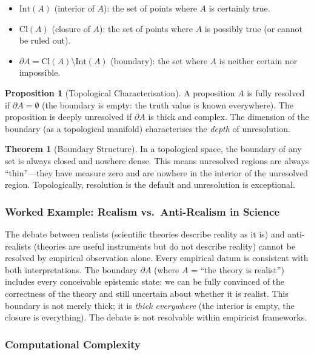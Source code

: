 \documentclass[11pt,letterpaper]{article}
\theoremstyle{definition}
\newtheorem{proposition}{Proposition}[section]
\newtheorem{theorem}{Theorem}[section]
\theoremstyle{remark}
\begin{document}
\begin{itemize}
\item $\mathrm{Int}(A)$ (interior of $A$): the set of points where $A$ is certainly true.
\item $\mathrm{Cl}(A)$ (closure of $A$): the set of points where $A$ is possibly true (or cannot be ruled out).
\item $\partial A = \mathrm{Cl}(A) \setminus \mathrm{Int}(A)$ (boundary): the set where $A$ is neither certain nor impossible.
\end{itemize}

\begin{proposition}[Topological Characterisation]
A proposition $A$ is fully resolved if $\partial A = \emptyset$ (the boundary is empty: the truth value is known everywhere). The proposition is deeply unresolved if $\partial A$ is thick and complex. The dimension of the boundary (as a topological manifold) characterises the \emph{depth} of unresolution.
\end{proposition}

\begin{theorem}[Boundary Structure]
In a topological space, the boundary of any set is always closed and nowhere dense. This means unresolved regions are always ``thin''---they have measure zero and are nowhere in the interior of the unresolved region. Topologically, resolution is the default and unresolution is exceptional.
\end{theorem}

\subsubsection*{Worked Example: Realism vs.\ Anti-Realism in Science}

The debate between realists (scientific theories describe reality as it is) and anti-realists (theories are useful instruments but do not describe reality) cannot be resolved by empirical observation alone. Every empirical datum is consistent with both interpretations. The boundary $\partial A$ (where $A$ = ``the theory is realist'') includes every conceivable epistemic state: we can be fully convinced of the correctness of the theory and still uncertain about whether it is realist. This boundary is not merely thick; it is \emph{thick everywhere} (the interior is empty, the closure is everything). The debate is not resolvable within empiricist frameworks.

\subsubsection*{Computational Complexity}
\end{document}
